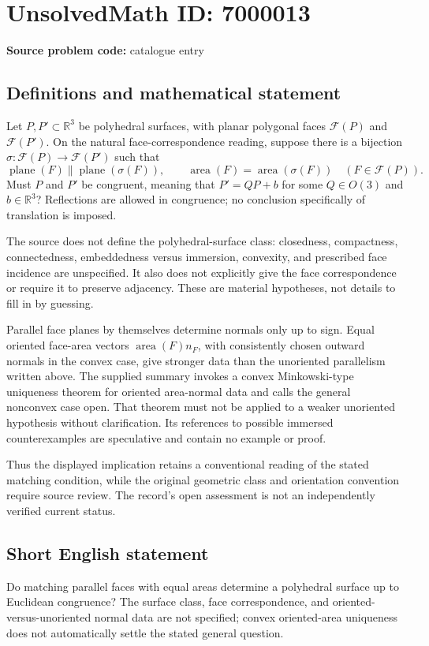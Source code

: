 \documentclass[11pt]{article}
\begin{document}
\section*{UnsolvedMath ID: 7000013}
\textbf{Source problem code:} catalogue entry
\subsection{Definitions and mathematical statement}
Let \(P,P'\subset\mathbb R^3\) be polyhedral surfaces, with planar polygonal faces \(\mathcal F(P)\) and \(\mathcal F(P')\). On the natural face-correspondence reading, suppose there is a bijection \(\sigma:\mathcal F(P)\to\mathcal F(P')\) such that
\[
 \operatorname{plane}(F)\parallel\operatorname{plane}(\sigma(F)),\qquad
 \operatorname{area}(F)=\operatorname{area}(\sigma(F))
 \quad(F\in\mathcal F(P)).
\]
Must \(P\) and \(P'\) be congruent, meaning that \(P'=QP+b\) for some \(Q\in O(3)\) and \(b\in\mathbb R^3\)? Reflections are allowed in congruence; no conclusion specifically of translation is imposed.

The source does not define the polyhedral-surface class: closedness, compactness, connectedness, embeddedness versus immersion, convexity, and prescribed face incidence are unspecified. It also does not explicitly give the face correspondence or require it to preserve adjacency. These are material hypotheses, not details to fill in by guessing.

Parallel face planes by themselves determine normals only up to sign. Equal oriented face-area vectors \(\operatorname{area}(F)n_F\), with consistently chosen outward normals in the convex case, give stronger data than the unoriented parallelism written above. The supplied summary invokes a convex Minkowski-type uniqueness theorem for oriented area-normal data and calls the general nonconvex case open. That theorem must not be applied to a weaker unoriented hypothesis without clarification. Its references to possible immersed counterexamples are speculative and contain no example or proof.

Thus the displayed implication retains a conventional reading of the stated matching condition, while the original geometric class and orientation convention require source review. The record's open assessment is not an independently verified current status.
\subsection{Short English statement}
Do matching parallel faces with equal areas determine a polyhedral surface up to Euclidean congruence? The surface class, face correspondence, and oriented-versus-unoriented normal data are not specified; convex oriented-area uniqueness does not automatically settle the stated general question.
\end{document}
